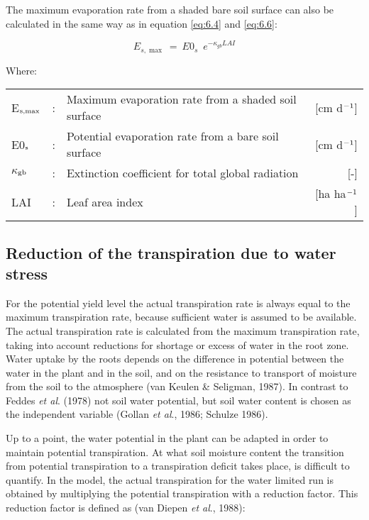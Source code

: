 The maximum evaporation rate from a shaded bare soil surface can also be calculated in
the same way as in equation \ref{eq:6.4} and \ref{eq:6.6}:

\begin{equation}
\label{eq:6.7}
E_{s,\max } ~=~ E0 _{s} \,\,\, e ^{-\kappa  _{gb} LAI}
\end{equation}

Where:\\[5pt]
\begin{tabularx}{\textwidth}{llXr}
	E$_{{\rm s,max}}$ &:& Maximum evaporation rate from a shaded 
	soil surface & [cm d$^{{\rm -1}}$]\\
	E0$_{{\rm s}}$ &:& Potential evaporation rate from a bare soil 
	surface & [cm d$^{{\rm -1}}$]\\
	$\kappa$$_{{\rm gb}}$ &:& Extinction coefficient for total global radiation & [-]\\
	LAI &:& Leaf area index & [ha ha$^{{\rm -1}}$]\\
\end{tabularx}

\subsection{Reduction of the transpiration due to water stress}

For the potential yield level the actual transpiration rate is always equal to the maximum
transpiration rate, because sufficient water is assumed to be available. The actual transpiration rate is
calculated from the maximum transpiration rate, taking into account reductions for
shortage or excess of water in the root zone. Water uptake by the roots depends on the
difference in potential between the water in the plant and in the soil, and on the resistance
to transport of moisture from the soil to the atmosphere (van Keulen \& Seligman, 1987).
In contrast to Feddes {\it et al}. (1978) not soil water potential, but soil water content is
chosen as the independent variable (Gollan {\it et al}., 1986; Schulze 1986).

Up to a point, the water potential in the plant can be adapted in order to maintain
potential transpiration. At what soil moisture content the transition from potential
transpiration to a transpiration deficit takes place, is difficult to quantify. In the model,
the actual transpiration for the water limited run is obtained by multiplying the potential
transpiration with a reduction factor. This reduction factor is defined as (van Diepen {\it et al}., 1988):

